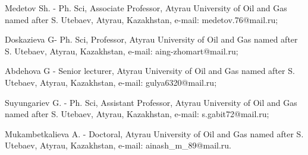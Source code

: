 \begin{authorinfo}
Medetov Sh. - Ph. Sci, Associate Professor, Atyrau Uni󠀁versity of Oil and
Gas nam󠀁ed aft󠀁er S. Ute󠀁baev, Aty󠀁rau, Kaz󠀁akhstan, e-mail: medetov.76@mail.ru;

Doskazieva G- Ph. Sci, Professor, Atyrau Uni󠀁versity of Oil and Gas nam󠀁ed
aft󠀁er S. Ute󠀁baev, Aty󠀁rau, Kaz󠀁akhstan, e-mail: aing-zhomart@mail.ru;

Abdehova G - Senior lecturer, Atyrau Uni󠀁versity of Oil and Gas
nam󠀁ed aft󠀁er S. Ute󠀁baev, Aty󠀁rau, Kaz󠀁akhstan, e-mail:
gulya6320@mail.ru;

Suyungariev G. - Ph. Sci, Assistant Professor, Atyrau
Uni󠀁versity of Oil and Gas nam󠀁ed aft󠀁er S. Ute󠀁baev, Aty󠀁rau, Kaz󠀁akhstan,
e-mail: s.gabit72@mail.ru;

Mukambetkalieva A. - Doctoral, Atyrau Uni󠀁versity of Oil and Gas nam󠀁ed
aft󠀁er S. Ute󠀁baev, Aty󠀁rau, Kaz󠀁akhstan, e-mail: ainash\_m\_89@mail.ru.
\end{authorinfo}
